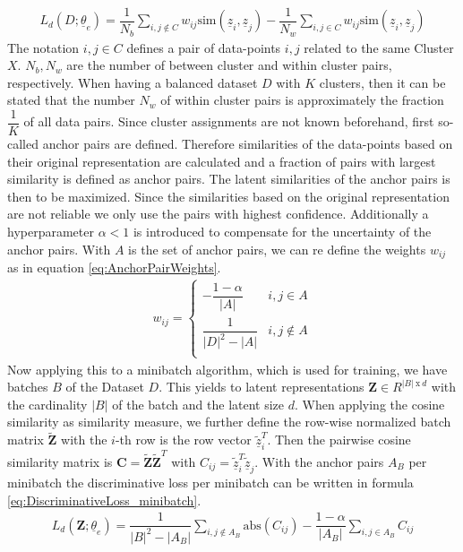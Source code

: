 \documentclass[12pt,DIV14,BCOR12mm,a4paper,footexclude,headinclude,halfparskip-,twoside,openright,openany,cleardoubleempty,idxtotoc,bibtotoc]{scrreprt} %
\numberwithin{equation}{chapter}
\begin{document}
\begin{align}
	 L_d(D;\underline{\theta}_e) = \dfrac{1}{N_b}\sum_{i,j \not\in C}w_{ij}\textrm{sim}(\underline{z}_i,\underline{z}_j)-\dfrac{1}{N_w}\sum_{i,j \in C}w_{ij}\textrm{sim}(\underline{z}_i,\underline{z}_j)\label{eq:DiscriminativeLoss_ClusterAssignments}
\end{align}
The notation $i,j \in C$ defines a pair of data-points $i,j$ related to the same Cluster $X$. $N_b,N_w$ are the number of between cluster and within cluster pairs, respectively. When having a balanced dataset $D$ with $K$ clusters, then it can be stated that the number $N_w$ of within cluster pairs is approximately the fraction $\dfrac{1}{K}$ of all data pairs. Since cluster assignments are not known beforehand, first so-called anchor pairs are defined. Therefore similarities of the data-points based on their original representation are calculated and a fraction of pairs with largest similarity is defined as anchor pairs. The latent similarities of the anchor pairs is then to be maximized. Since the similarities based on the original representation are not reliable we only use the pairs with highest confidence. Additionally a hyperparameter $\alpha < 1$ is introduced to compensate for the uncertainty of the anchor pairs. With $A$ is the set of anchor pairs, we can re define the weights $w_{ij}$ as in equation \ref{eq:AnchorPairWeights}.
\begin{align}
	w_{ij} = \begin{cases} -\dfrac{1-\alpha}{|A|} & i,j \in A \\ \dfrac{1}{|D|^2-|A|} & i,j \not\in A\\ \end{cases} \label{eq:AnchorPairWeights}
\end{align}
Now applying this to a minibatch algorithm, which is used for training, we have batches $B$ of the Dataset $D$. This yields to latent representations $\mathbf{Z} \in R^{|B|\ \textrm{x}\ d}$ with the cardinality $|B|$ of the batch and the latent size $d$. When applying the cosine similarity as similarity measure, we further define the row-wise normalized batch matrix $\tilde{\mathbf{Z}}$ with the $i$-th row is the row vector $\tilde{\underline{z}}^{T}_i$. Then the pairwise cosine similarity matrix is $\mathbf{C} = \tilde{\mathbf{Z}}\tilde{\mathbf{Z}}^T$ with $C_{ij} = \tilde{\underline{z}}^{T}_i \tilde{\underline{z}}_j$. With the anchor pairs $A_B$ per minibatch the discriminative loss per minibatch can be written in formula \ref{eq:DiscriminativeLoss_minibatch}.
\begin{align}
	 L_d(\mathbf{Z};\underline{\theta}_e) = \dfrac{1}{|B|^2-|A_B|}\sum_{i,j \not\in A_B}\textrm{abs}(C_{ij})-\dfrac{1-\alpha}{|A_B|}\sum_{i,j \in A_B}C_{ij}\label{eq:DiscriminativeLoss_minibatch}
\end{align}
\end{document}
